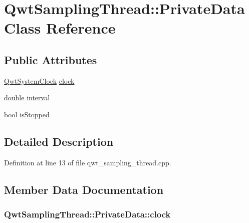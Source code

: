 \hypertarget{class_qwt_sampling_thread_1_1_private_data}{\section{Qwt\-Sampling\-Thread\-:\-:Private\-Data Class Reference}
\label{class_qwt_sampling_thread_1_1_private_data}
}
\subsection*{Public Attributes}
\begin{DoxyCompactItemize}
\item 
\hyperlink{class_qwt_system_clock}{Qwt\-System\-Clock} \hyperlink{class_qwt_sampling_thread_1_1_private_data_a6d7a720433d99170379b597d73f75bf3}{clock}
\item 
\hyperlink{_super_l_u_support_8h_a8956b2b9f49bf918deed98379d159ca7}{double} \hyperlink{class_qwt_sampling_thread_1_1_private_data_ad483727409f9d72022e89fdbab47c0b5}{interval}
\item 
bool \hyperlink{class_qwt_sampling_thread_1_1_private_data_ab2452489acbea2a570fcdbb73c867f1f}{is\-Stopped}
\end{DoxyCompactItemize}


\subsection{Detailed Description}


Definition at line 13 of file qwt\-\_\-sampling\-\_\-thread.\-cpp.



\subsection{Member Data Documentation}
\hypertarget{class_qwt_sampling_thread_1_1_private_data_a6d7a720433d99170379b597d73f75bf3}{
\subsubsection[{clock}]{ Qwt\-Sampling\-Thread\-::\-Private\-Data\-::clock}}\label{class_qwt_sampling_thread_1_1_private_data_a6d7a720433d99170379b597d73f75bf3}


